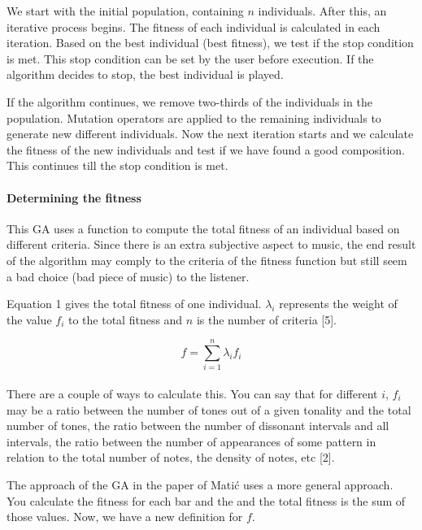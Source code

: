\documentclass[12pt]{article}
\begin{document}
We start with the initial population, containing $n$ individuals. After this, an iterative process begins. The fitness of each individual is calculated in each iteration. Based on the best individual (best fitness), we test if the stop condition is met. This stop condition can be set by the user before execution. If the algorithm decides to stop, the best individual is played.
\newline

If the algorithm continues, we remove two-thirds of the individuals in the population. Mutation operators are applied to the remaining individuals to generate new different individuals. Now the next iteration starts and we calculate the fitness of the new individuals and test if we have found a good composition.
This continues till the stop condition is met.

\paragraph{Determining the fitness}

This GA uses a function to compute the total fitness of an individual based on different criteria. Since there is an extra subjective aspect to music, the end result of the algorithm may comply to the criteria of the fitness function but still seem a bad choice (bad piece of music) to the listener. 
\newline

Equation 1 gives the total fitness of one individual. $\lambda_i$ represents the weight of the value $f_i$ to the total fitness and $n$ is the number of criteria [5].

\begin{equation}
f = \sum_{i = 1}^{n}\lambda_i f_i
\end{equation}
\\
There are a couple of ways to calculate this. You can say that for different $i$, $f_i$ may be a ratio between the number of tones out of a given tonality and the total number of tones, the ratio between the number of dissonant intervals and all intervals, the ratio between the number of appearances of some pattern in relation to the total number of notes, the density of notes, etc [2]. 
\newline

The approach of the GA in the paper of Mati\'c uses a more general approach. You calculate the fitness for each bar and the and the total fitness is the sum of those values. Now, we have a new definition for $f$.
\end{document}
